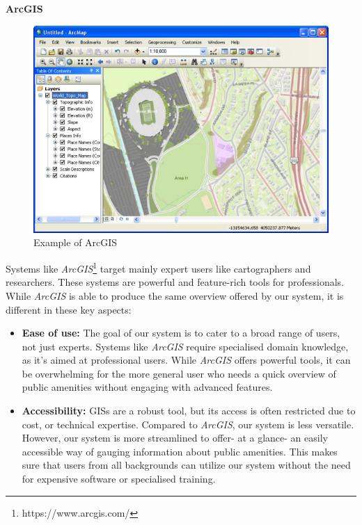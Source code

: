 \noindent{}\textbf{ArcGIS}

\begin{figure}[h]
  \centering
  \includegraphics[width=0.85\columnwidth]{images/arcgis.png}
  \caption{Example of ArcGIS}
  \label{fig:arcgis}
\end{figure}

\noindent{}Systems like \textit{ArcGIS}\footnote{https://www.arcgis.com/} target
mainly expert users like cartographers and researchers. These systems are powerful
and feature-rich tools for professionals. While \textit{ArcGIS} is able to produce
the same overview offered by our system, it is different in these key aspects:

\begin{samepage}
\begin{itemize}
    \item{\textbf{Ease of use:} The goal of our system is to cater to a broad
    range of users, not just experts. Systems like \textit{ArcGIS} require
    specialised domain knowledge, as it's aimed at professional users. While
    \textit{ArcGIS} offers powerful tools, it can be overwhelming for the more
    general user who needs a quick overview of public amenities without engaging
    with advanced features.}
  \vspace{1.25mm}

  \item{\textbf{Accessibility:} GISs are a robust tool, but its access is often
  restricted due to cost, or technical expertise. Compared to \textit{ArcGIS},
  our system is less versatile. However, our system is more streamlined to
  offer- at a glance- an easily accessible way of gauging information about
  public amenities. This makes sure that users from all backgrounds can utilize
  our system without the need for expensive software or specialised training.}
  \vspace{1.25mm}

\end{itemize}
\end{samepage}

\pagebreak{}